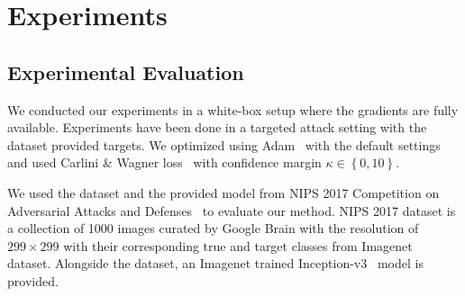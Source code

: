 \chapter{Experiments}
\label{chp:4_results}
\section{Experimental Evaluation}
We conducted our experiments in a white-box setup where the gradients are fully available. Experiments have been done in a targeted attack setting with the dataset provided targets. We optimized using Adam~\cite{kingma2015adam} with the default settings and used Carlini \& Wagner loss~\cite{carlini2017towards} with confidence margin \(\kappa \in \left\{ 0, 10 \right\}\).


We used the dataset and the provided model from NIPS 2017 Competition on Adversarial Attacks and Defenses~\cite{kurakin2018adversarial} to evaluate our method. NIPS 2017 dataset is a collection of 1000 images curated by Google Brain with the resolution of \(299 \times 299\) with their corresponding true and target classes from Imagenet~\cite{deng2009imagenet} dataset. Alongside the dataset, an Imagenet trained Inception-v3~\cite{szegedy2016rethinking} model is provided. %

